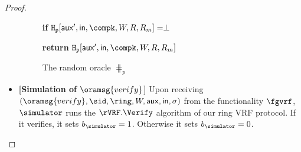\begin{proof}
\begin{itemize}
\begin{figure}
{{					
					
					
					
			
	
					\textbf{if} $ \mathtt{H_p}[\aux', \msg,\compk,W,R,R_m]  = \perp $
					
					
					
					{\textbf{return} $  \mathtt{H_p}[\aux',\msg,\compk,W,R,R_m]   $}
					
 			}}
			\caption{The random oracle $ \hash_p $}
			\label{oracle:Hout}
		\end{figure}
		
		
		
		
		\item \textbf{[Simulation of $ \oramsg{verify} $]} Upon receiving  $(\oramsg{verify}, \sid, \ring,W, \aux,\msg, \sigma)$ from the functionality $\fgvrf$, $ \simulator $ runs the $ \rVRF.\Verify $ algorithm of our ring VRF protocol. If  it verifies, it sets $ b_{\simulator} =1 $. Otherwise it sets $ b_{\simulator} =0  $.
		

\end{itemize}
\end{proof}
